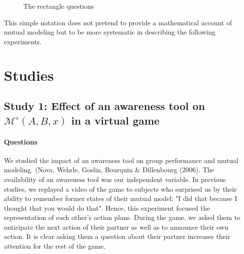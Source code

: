 \documentclass[twocolumn]{article}
\newcommand{\Model}[3]{{$\mathcal{M}^{\circ}(#1, #2, #3)$}}
\begin{document}
\begin{figure}[htb]
\centering


\caption{The rectangle questions}

\label{mm_rectangle}
\end{figure}


This simple notation does not pretend to provide a mathematical account of
mutual modeling but to be more systematic in describing the following
experiments. 

\section{Studies}

\subsection{Study 1: Effect of an awareness tool on \Model{A}{B}{x} in a virtual
game}

\paragraph{Questions}

We studied the impact of an awareness tool on group performance and mutual
modeling. (Nova, Wehrle, Goslin, Bourquin \& Dillenbourg (2006). The availability
of an awareness tool was our independent variable. In previous studies, we
replayed a video of the game to subjects who surprised us by their ability to
remember former states of their mutual model: "I did that because I thought that
you would do that". Hence, this experiment focused the representation of each
other's action plans. During the game, we asked them to anticipate the next
action of their partner as well as to announce their own action. It is clear
asking them a question about their partner increases their attention for the
rest of the game.
\end{document}
